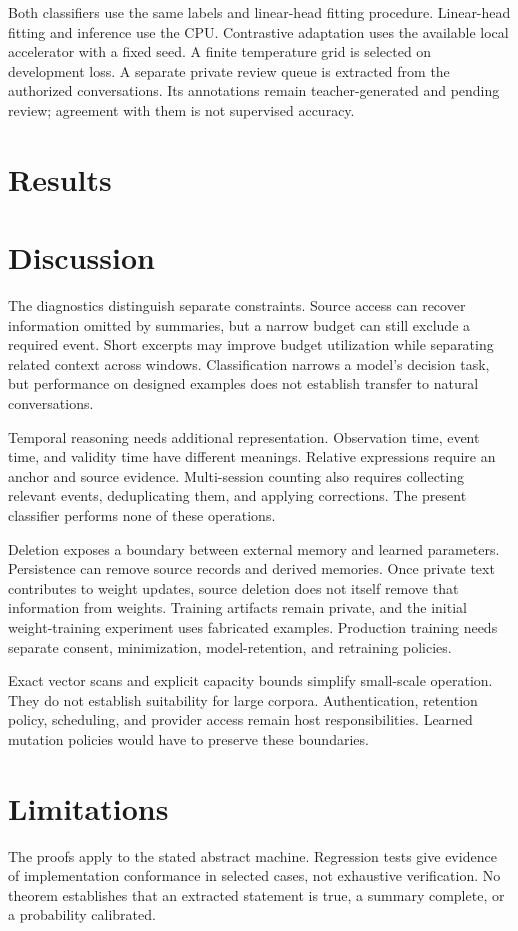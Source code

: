 \documentclass[11pt]{article}
\begin{document}
Both classifiers use the same labels and linear-head fitting procedure. Linear-head fitting and inference use the CPU. Contrastive adaptation uses the available local accelerator with a fixed seed. A finite temperature grid is selected on development loss. A separate private review queue is extracted from the authorized conversations. Its annotations remain teacher-generated and pending review; agreement with them is not supervised accuracy.

\section{Results}


\section{Discussion}
The diagnostics distinguish separate constraints. Source access can recover information omitted by summaries, but a narrow budget can still exclude a required event. Short excerpts may improve budget utilization while separating related context across windows. Classification narrows a model's decision task, but performance on designed examples does not establish transfer to natural conversations.

Temporal reasoning needs additional representation. Observation time, event time, and validity time have different meanings. Relative expressions require an anchor and source evidence. Multi-session counting also requires collecting relevant events, deduplicating them, and applying corrections. The present classifier performs none of these operations.

Deletion exposes a boundary between external memory and learned parameters. Persistence can remove source records and derived memories. Once private text contributes to weight updates, source deletion does not itself remove that information from weights. Training artifacts remain private, and the initial weight-training experiment uses fabricated examples. Production training needs separate consent, minimization, model-retention, and retraining policies.

Exact vector scans and explicit capacity bounds simplify small-scale operation. They do not establish suitability for large corpora. Authentication, retention policy, scheduling, and provider access remain host responsibilities. Learned mutation policies would have to preserve these boundaries.

\section{Limitations}
The proofs apply to the stated abstract machine. Regression tests give evidence of implementation conformance in selected cases, not exhaustive verification. No theorem establishes that an extracted statement is true, a summary complete, or a probability calibrated.
\end{document}

